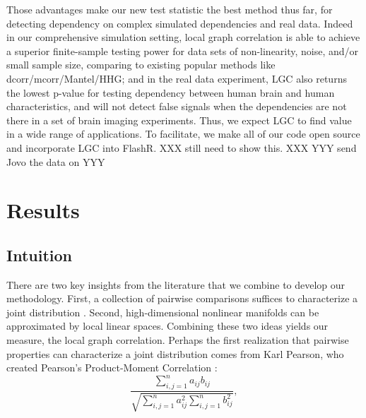 \documentclass[11pt]{article}
\begin{document}
Those advantages make our new test statistic the best method thus far, for detecting dependency on complex simulated dependencies and real data. Indeed in our comprehensive simulation setting, local graph correlation is able to achieve a superior finite-sample testing power for data sets of non-linearity, noise, and/or small sample size, comparing to existing popular methods like dcorr/mcorr/Mantel/HHG; and in the real data experiment, LGC also returns the lowest p-value for testing dependency between human brain and human characteristics,  and will not detect false signals when the dependencies are not there in a set of brain imaging experiments. Thus, we expect LGC to find value in a wide range of applications.  To facilitate, we make all of our code open source and incorporate LGC into FlashR.
XXX still need to show this. XXX  
YYY send Jovo the data on YYY


\section{Results}

\subsection{Intuition}

There are two key insights from the literature that we combine to develop our methodology.  First, a collection of pairwise comparisons  suffices to characterize a joint distribution \cite{Maa1996}.  Second, high-dimensional nonlinear manifolds can be approximated by local linear spaces.  Combining these two ideas yields our measure, the local graph correlation.  Perhaps the first realization that pairwise properties can characterize a joint distribution comes from  Karl Pearson, who created Pearson's Product-Moment Correlation \cite{Pearson1895}:
\begin{equation}
\label{generalCoef}
\frac{\sum_{i,j=1}^n a_{ij} b_{ij}}{\sqrt{\sum_{i,j=1}^n  a_{ij}^{2} \sum_{i,j=1}^n b_{ij}^{2}}}, 
\end{equation}
\end{document}
